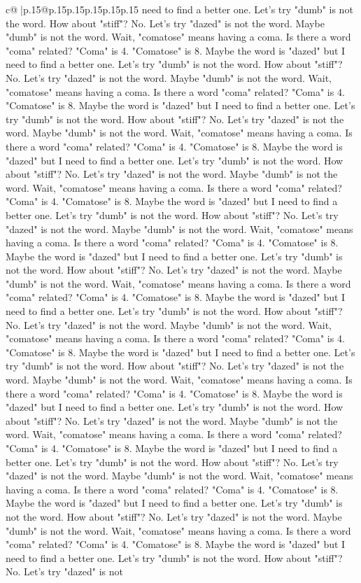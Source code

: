 \documentclass{article}
\begin{document}
{\begin{supertabular}{c@{$\;$}|p{.15\linewidth}@{}p{.15\linewidth}p{.15\linewidth}p{.15\linewidth}p{.15\linewidth}p{.15\linewidth}}
{{{need to find a better one. Let's try "dumb" is not the word. How about "stiff"? No. Let's try "dazed" is not the word. Maybe "dumb" is not the word. Wait, "comatose" means having a coma. Is there a word "coma" related? "Coma" is 4. "Comatose" is 8. Maybe the word is "dazed" but I need to find a better one. Let's try "dumb" is not the word. How about "stiff"? No. Let's try "dazed" is not the word. Maybe "dumb" is not the word. Wait, "comatose" means having a coma. Is there a word "coma" related? "Coma" is 4. "Comatose" is 8. Maybe the word is "dazed" but I need to find a better one. Let's try "dumb" is not the word. How about "stiff"? No. Let's try "dazed" is not the word. Maybe "dumb" is not the word. Wait, "comatose" means having a coma. Is there a word "coma" related? "Coma" is 4. "Comatose" is 8. Maybe the word is "dazed" but I need to find a better one. Let's try "dumb" is not the word. How about "stiff"? No. Let's try "dazed" is not the word. Maybe "dumb" is not the word. Wait, "comatose" means having a coma. Is there a word "coma" related? "Coma" is 4. "Comatose" is 8. Maybe the word is "dazed" but I need to find a better one. Let's try "dumb" is not the word. How about "stiff"? No. Let's try "dazed" is not the word. Maybe "dumb" is not the word. Wait, "comatose" means having a coma. Is there a word "coma" related? "Coma" is 4. "Comatose" is 8. Maybe the word is "dazed" but I need to find a better one. Let's try "dumb" is not the word. How about "stiff"? No. Let's try "dazed" is not the word. Maybe "dumb" is not the word. Wait, "comatose" means having a coma. Is there a word "coma" related? "Coma" is 4. "Comatose" is 8. Maybe the word is "dazed" but I need to find a better one. Let's try "dumb" is not the word. How about "stiff"? No. Let's try "dazed" is not the word. Maybe "dumb" is not the word. Wait, "comatose" means having a coma. Is there a word "coma" related? "Coma" is 4. "Comatose" is 8. Maybe the word is "dazed" but I need to find a better one. Let's try "dumb" is not the word. How about "stiff"? No. Let's try "dazed" is not the word. Maybe "dumb" is not the word. Wait, "comatose" means having a coma. Is there a word "coma" related? "Coma" is 4. "Comatose" is 8. Maybe the word is "dazed" but I need to find a better one. Let's try "dumb" is not the word. How about "stiff"? No. Let's try "dazed" is not the word. Maybe "dumb" is not the word. Wait, "comatose" means having a coma. Is there a word "coma" related? "Coma" is 4. "Comatose" is 8. Maybe the word is "dazed" but I need to find a better one. Let's try "dumb" is not the word. How about "stiff"? No. Let's try "dazed" is not the word. Maybe "dumb" is not the word. Wait, "comatose" means having a coma. Is there a word "coma" related? "Coma" is 4. "Comatose" is 8. Maybe the word is "dazed" but I need to find a better one. Let's try "dumb" is not the word. How about "stiff"? No. Let's try "dazed" is not the word. Maybe "dumb" is not the word. Wait, "comatose" means having a coma. Is there a word "coma" related? "Coma" is 4. "Comatose" is 8. Maybe the word is "dazed" but I need to find a better one. Let's try "dumb" is not the word. How about "stiff"? No. Let's try "dazed" is not }}}
\end{supertabular}}
\end{document}
